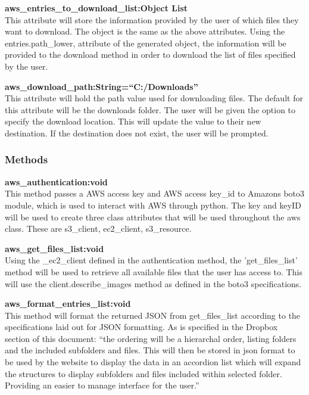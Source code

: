 \textbf{aws\_entries\_to\_download\_list:Object List} \\
    This attribute will store the information provided by the user of which files they want to download. The object is the same as the above 
    attributes. Using the entries.path\_lower, attribute of the generated object, the information will be provided to the download method in 
    order to download the list of files specified by the user.

\textbf{aws\_download\_path:String=``C:/Downloads''} \\
    This attribute will hold the path value used for downloading files. The default for this attribute will be the downloads folder. The user 
    will be given the option to specify the download location. This will update the value to their new destination. If the destination does 
    not exist, the user will be prompted.

\subsubsection{Methods}
\textbf{aws\_authentication:void} \\
    This method passes a AWS access key and AWS access key\_id to Amazons boto3 module, which is used to interact with AWS through python. The key 
    and keyID will be used to create three class attributes that will be used throughout the aws class. These are s3\_client, ec2\_client, s3\_resource.
    
\textbf{aws\_get\_files\_list:void} \\
    Using the \_ec2\_client defined in the authentication method, the 'get\_files\_list' method will be used to retrieve all available files that the user 
    has access to. This will use the client.describe\_images method as defined in the boto3 specifications.

\textbf{aws\_format\_entries\_list:void} \\
    This method will format the returned JSON from get\_files\_list according to the specifications laid out for JSON formatting. As is specified in the
    Dropbox section of this document: ``the ordering will be a hierarchal order, listing folders and the included subfolders and files. This will then be stored in json format to be used by the website to display the data in an
    accordion list which will expand the structures to display subfolders and files included within selected folder. Providing an easier to manage
    interface for the user.''

